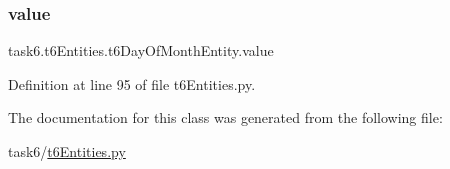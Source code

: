 \subsubsection{\texorpdfstring{value}{value}}
{\footnotesize\ttfamily task6.\+t6\+Entities.\+t6\+Day\+Of\+Month\+Entity.\+value}



Definition at line 95 of file t6\+Entities.\+py.



The documentation for this class was generated from the following file\+:\begin{DoxyCompactItemize}
\item 
task6/\hyperlink{t6Entities_8py}{t6\+Entities.\+py}\end{DoxyCompactItemize}

